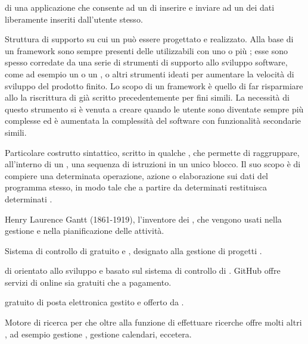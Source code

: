 { di una applicazione che consente ad un  di inserire e inviare ad un  dei dati liberamente inseriti dall'utente stesso.}

{Struttura di supporto su cui un  può essere progettato e realizzato. Alla base di un framework sono sempre presenti delle  utilizzabili con uno o più ; esse sono spesso corredate da una serie di strumenti di supporto allo sviluppo software, come ad esempio un  o un , o altri strumenti ideati per aumentare la velocità di sviluppo del prodotto finito.
Lo scopo di un framework è quello di far risparmiare allo  la riscrittura di  già scritto precedentemente per fini simili. La necessità di questo strumento si è venuta a creare quando le  utente sono diventate sempre più complesse ed è aumentata la complessità del software con funzionalità secondarie simili.}

{Particolare costrutto sintattico, scritto in qualche , che permette di raggruppare, all'interno di un , una sequenza di istruzioni in un unico blocco. Il suo scopo è di compiere una determinata operazione, azione o elaborazione sui dati del programma stesso, in modo tale che a partire da determinati  restituisca determinati .}




{Henry Laurence Gantt (1861-1919), l'inventore dei , che vengono usati nella gestione e nella pianificazione delle attività.}

{Sistema di controllo di   gratuito e , designato alla gestione di progetti .}

{ di   orientato allo sviluppo  e basato sul sistema di controllo di  . GitHub offre servizi di  online sia gratuiti che a pagamento.}

{ gratuito di posta elettronica gestito e offerto da .}

{Motore di ricerca per  che oltre alla funzione di effettuare ricerche offre molti altri , ad esempio gestione , gestione calendari, eccetera.} 

